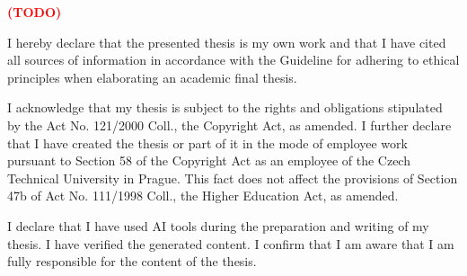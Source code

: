 \documentclass[english,master,oneside]{ctufit-thesis}
\newcommand{\todoadd}[0]{\textbf{\textcolor{red}{(TODO)}}}
\begin{document}
\frontmatter\frontmatterinit %

\thispagestyle{empty}\maketitle\thispagestyle{empty}\cleardoublepage %



\imprintpage %
\stopTOCentries

\begin{acknowledgmentpage}
	\todoadd
\end{acknowledgmentpage}


\begin{declarationpage}
I hereby declare that the presented thesis is my own work and that I have cited all sources of information in accordance with the Guideline for adhering to ethical principles when elaborating an academic final thesis.

I acknowledge that my thesis is subject to the rights and obligations stipulated by the Act No. 121/2000 Coll., the Copyright Act, as amended. I further declare that I have created the thesis or part of it in the mode of employee work pursuant to Section 58 of the Copyright Act as an employee of the Czech Technical University in Prague. This fact does not affect the provisions of Section 47b of Act No. 111/1998 Coll., the Higher Education Act, as amended.

I declare that I have used AI tools during the preparation and writing of my thesis. I have verified the generated content. I confirm that I am aware that I am fully responsible for the content of the thesis.
\end{declarationpage}

\printabstractpage

\tableofcontents

\listoffigures
\begingroup
\let\clearpage\relax
\listoftables
\thectufitlistingscommand
\endgroup
\end{document}
